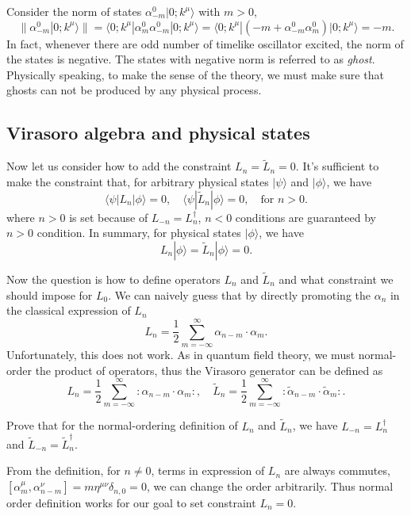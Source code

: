 \documentclass[graybox,envcountchap,sectrefs]{svmono}
\begin{document}
Consider the norm of states $\alpha^0_{-m}|0;k^{\mu}\rangle$ with $m>0$,
\begin{equation}
\|\alpha^0_{-m}|0;k^{\mu}\rangle\|=\langle 0;k^{\mu}|\alpha_{m}^0\alpha^0_{-m}|0;k^{\mu}\rangle=\langle 0;k^{\mu}|(-m+\alpha_{-m}^0\alpha^0_{m})|0;k^{\mu}\rangle=-m.
\end{equation}
In fact, whenever there are odd number of timelike oscillator excited, the norm of the states is negative.
The states with negative norm is referred to as \emph{ghost}. Physically speaking, to make the sense of the theory, we must make sure that ghosts can not be produced by any physical process.

\subsection{Virasoro algebra and physical states}
Now let us consider how to add the constraint $L_{n}=\tilde{L}_n=0$. 
It's sufficient to make the constraint that, for arbitrary physical states $|\psi\rangle$ and $|\phi\rangle$, we have
\begin{equation}
\langle \psi |L_n|\phi\rangle=0,\quad 	\langle \psi |\tilde{L}_n|\phi\rangle=0, \quad \text{for} \,\, n>0.
\end{equation}
where $n>0$ is set because of $L_{-n}=L_n^{\dagger}$, $n<0$ conditions are guaranteed by $n>0$ condition. In summary, for physical states $|\phi\rangle$, we have
\begin{equation}
L_n|\phi\rangle=\tilde{L}_n|\phi\rangle=0	.
\end{equation}
 

Now the question is how to define operators $L_n$ and $\tilde{L}_n$ and what constraint we should impose for $L_0$. We can naively guess that by directly promoting the $\alpha_n$ in the classical expression of $L_n$
\begin{equation}
L_n=\frac{1}{2}\sum_{m=-\infty}^{\infty}\alpha_{n-m}\cdot\alpha_{m}.	
\end{equation}
Unfortunately, this does not work. As in quantum field theory, we must normal-order the product of operators, thus the Virasoro generator can be defined as
\begin{equation}
L_n	=\frac{1}{2}\sum_{m=-\infty}^{\infty}:\alpha_{n-m}\cdot\alpha_{m}:,\quad \tilde{L}_n	=\frac{1}{2}\sum_{m=-\infty}^{\infty}:\tilde{\alpha}_{n-m}\cdot\tilde{\alpha}_{m}:.
\end{equation}
\begin{exercise}
	Prove that for the normal-ordering definition of $L_n$ and $\tilde{L}_n$, we have $L_{-n}=L_n^{\dagger}$ and  $\tilde{L}_{-n}=\tilde{L}_{n}^{\dagger}$.
\end{exercise}
From the definition, for $n\neq 0$, terms in expression of $L_n$   
are always commutes, $[\alpha_m^{\mu},\alpha_{n-m}^{\nu}]=m\eta^{\mu\nu}\delta_{n,0}=0$, we can change the order arbitrarily. Thus normal order definition works for our goal to set constraint $L_n=0$. 
\end{document}
